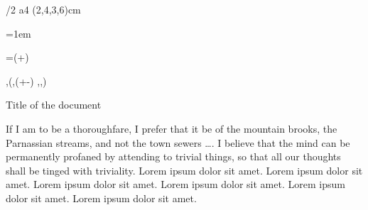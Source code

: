 \useOpTeX

\fontfam[Coelacanth]

\typosize[11/13]
\margins/2 a4 (2,4,3,6)cm    %



\parskip=0pt\relax
\parindent=1em\relax

\newdimen\mydim \mydim=\dimexpr(\voffset+\topskip)

\grid 1pc,\baselineskip(\hoffset,\dimexpr(\voffset+\topskip-\baselineskip) ,\hsize ,\vsize)

\lineskiplimit=-100pt\relax
\lineskip=0pt\relax


\tit Title of the document

If I am to be a thoroughfare, I prefer that it
be of the mountain brooks, the Parnassian streams, and not the
town sewers \dots . I believe that the mind can be permanently profaned by attending to trivial things, so that all our thoughts shall
be tinged with triviality.
Lorem ipsum dolor sit amet. Lorem ipsum dolor sit amet. Lorem ipsum dolor sit amet. Lorem ipsum dolor sit amet. Lorem ipsum dolor sit amet. Lorem ipsum dolor sit amet.



\bye

